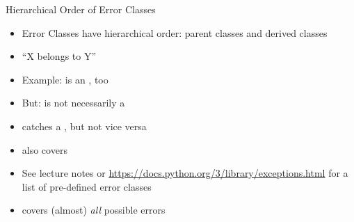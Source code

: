 
\begin{frame}[fragile]{Hierarchical Order of Error Classes}
%
\begin{itemize}
\item Error Classes have hierarchical order: parent classes and derived classes
\item \enquote{X belongs to Y}
\item Example:  is an , too
\item But:  is not necessarily a 
\item[\Thus]  catches a , but not vice versa
\item \eg {} also covers 
\item See lecture notes or \url{https://docs.python.org/3/library/exceptions.html} for a list of pre-defined error classes
\item {} covers (almost) \emph{all} possible errors
\end{itemize}
%
\end{frame}


